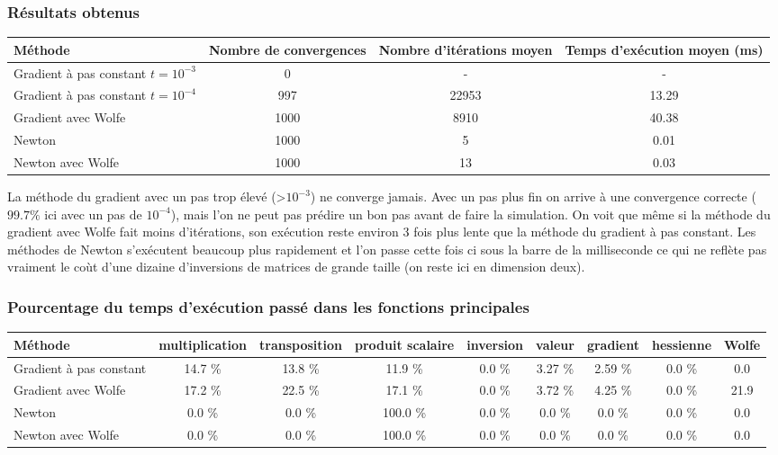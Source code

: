 \documentclass[a4paper,10pt]{article}
\begin{document}
\subsubsection{Résultats obtenus}
\vspace{0.5cm}
\begin{tabular}{|l|c|c|c|}
  \hline
  Méthode & Nombre de convergences & Nombre d'itérations moyen & Temps d'exécution moyen (ms)\\
  \hline
  Gradient à pas constant $t = 10^{-3}$& 0 & - & - \\
  Gradient à pas constant $t = 10^{-4}$& 997 & 22953 & 13.29 \\
  Gradient avec Wolfe & 1000 & 8910 & 40.38 \\
  Newton & 1000 & 5 & 0.01 \\
  Newton avec Wolfe & 1000 & 13 & 0.03 \\
  \hline
\end{tabular}

\vspace{1cm}
La méthode du gradient avec un pas trop élevé (>$10^{-3}$) ne converge jamais. Avec un pas plus fin on arrive à une convergence correcte ($99.7\%$ ici avec un pas de $10^{-4}$), mais l'on ne peut pas prédire un bon pas avant de faire la simulation.
On voit que même si la méthode du gradient avec Wolfe fait moins d'itérations, son exécution reste environ 3 fois plus lente que la méthode du gradient à pas constant. 
Les méthodes de Newton s'exécutent beaucoup plus rapidement et l'on passe cette fois ci sous la barre de la milliseconde ce qui ne reflète pas vraiment le coùt d'une dizaine d'inversions de matrices de grande taille (on reste ici en dimension deux).

\vspace{0.5cm}
\subsubsection{Pourcentage du temps d'exécution passé dans les fonctions principales}
\vspace{0.5cm}
\begin{tabular}{|l|c|c|c|c||c|c|c||c|}
  \hline
  Méthode & multiplication & transposition & produit scalaire & inversion & valeur & gradient & hessienne & Wolfe \\
  \hline
  Gradient à pas constant & 14.7  \% & 13.8 \% & 11.9 \% & 0.0 \% & 3.27 \% & 2.59 \% & 0.0 \% & 0.0\\ 
  Gradient avec Wolfe & 17.2  \% & 22.5 \% & 17.1 \% & 0.0 \% & 3.72 \% & 4.25 \% & 0.0 \% & 21.9 \\ 
  Newton & 0.0  \% & 0.0 \% & 100.0 \% & 0.0 \% & 0.0 \% & 0.0 \% & 0.0 \% & 0.0 \\ 
  Newton avec Wolfe & 0.0  \% & 0.0 \% & 100.0 \% & 0.0 \% & 0.0 \% & 0.0 \% & 0.0 \% & 0.0 \\ 
  \hline
\end{tabular}
\end{document}
